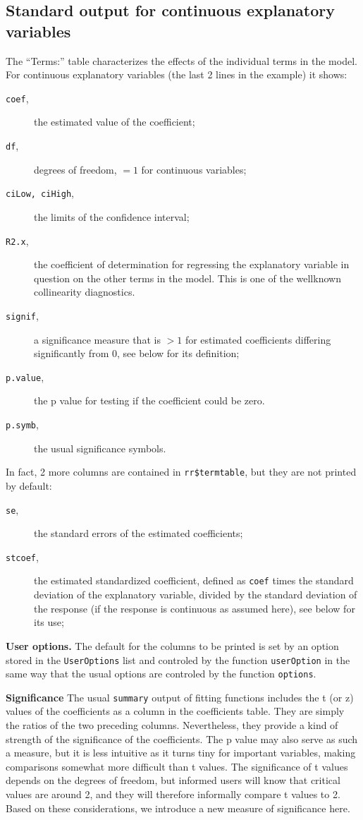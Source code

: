 \documentclass{article}
\providecommand{\T}{\texttt}
\providecommand{\Tit}[1]{\textbf{#1}\hspace{1em}}
\begin{document}
\subsection{Standard output for continuous explanatory variables}
The ``Terms:'' table characterizes the effects of the individual terms in
the model. For continuous explanatory variables (the last 2 lines in the
example) it shows:
\begin{description}
\item[\T{coef},] the estimated value of the coefficient;
\item[\T{df},] degrees of freedom, $=1$ for continuous variables;
\item[\T{ciLow, ciHigh},] the limits of the confidence interval;
\item[\T{R2.x},] the coefficient of determination for regressing 
  the explanatory variable in question on the other terms in the model.
  This is one of the wellknown collinearity diagnostics.
\item[\T{signif},] a significance measure that is $>1$ for estimated
  coefficients differing significantly from 0, see below for its
  definition;
\item[\T{p.value},] the p value for testing if the coefficient could be
  zero. 
\item[\T{p.symb},] the usual significance symbols.
\end{description}
In fact, 2 more columns are contained in \T{rr\$termtable}, but they are
not printed by default:
\begin{description}
\item[\T{se},] the standard errors of the estimated coefficients; 
\item[\T{stcoef},] the estimated standardized coefficient,
  defined as \T{coef} times the standard deviation of the explanatory
  variable, divided by the standard deviation of the response (if
  the response is continuous as assumed here), see below for its use;
\end{description}
\Tit{User options.}
The default for the columns to be printed is set by an option stored 
in the \T{UserOptions} list and controled by the function 
\T{userOption} in the same way that the usual options are
controled by the function \T{options}.

\Tit{Significance}
The usual \T{summary} output of fitting functions includes the 
t (or z) values of the coefficients as a column in the coefficients 
table. 
They are simply the ratios of the two preceding columns. 
Nevertheless, they provide a kind of strength of the significance of the
coefficients. The p value may also serve as such a measure, but it is less 
intuitive as it turns tiny for important variables, making comparisons
somewhat more difficult than t values. 
The significance of t values depends on the degrees of freedom, but
informed users will know that critical values are around 2, and they will
therefore informally compare t values to 2. 
Based on these considerations, we introduce a new measure of significance
here. 
\end{document}
